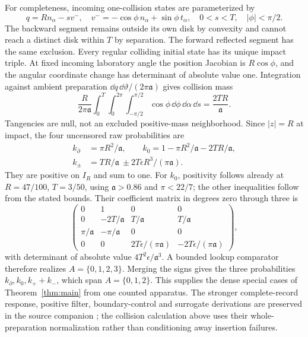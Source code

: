 For completeness, incoming one-collision states are parameterized by
\[
 q=Rn_\alpha-sv^-,\quad
 v^-=-\cos\phi\,n_\alpha+\sin\phi\,t_\alpha,
 \quad 0<s<T,\quad |\phi|<\pi/2.
\]
The backward segment remains outside its own disk by convexity and cannot
reach a distinct disk within $T$ by separation. The forward reflected
segment has the same exclusion. Every regular colliding initial state
has its unique impact triple. At fixed incoming laboratory angle the
position Jacobian is $R\cos\phi$, and the angular coordinate change
has determinant of absolute value one. Integration against ambient
preparation $\dd q\,\dd\vartheta/(2\pi\mathfrak a)$ gives collision
mass
\[
 \frac{R}{2\pi\mathfrak a}
      \int_0^T\int_0^{2\pi}\int_{-\pi/2}^{\pi/2}
                       \cos\phi\,\dd\phi\,\dd\alpha\,\dd s
 =\frac{2TR}{\mathfrak a}.
\]
Tangencies are null, not an excluded positive-mass neighborhood.
Since $|z|=R$ at impact, the four uncensored raw probabilities are
\begin{equation}\label{eq:mechanical-cells}
 \begin{split}
 k_\partial&=\pi R^2/\mathfrak a,\qquad
 k_0=1-\pi R^2/\mathfrak a-2TR/\mathfrak a,\\
 k_\pm&=TR/\mathfrak a\ \pm 2T\epsilon R^3/(\pi\mathfrak a).
 \end{split}
\end{equation}
They are positive on $I_R$ and sum to one. For $k_0$, positivity follows
already at $R=47/100$, $T=3/50$, using $\mathfrak a>0.86$ and
$\pi<22/7$; the other inequalities follow from the stated bounds.
Their coefficient matrix in degrees zero through three is
\[
 \begin{pmatrix}
 0&1&0&0\\
 0&-2T/\mathfrak a&T/\mathfrak a&T/\mathfrak a\\
 \pi/\mathfrak a&-\pi/\mathfrak a&0&0\\
 0&0&2T\epsilon/(\pi\mathfrak a)&-2T\epsilon/(\pi\mathfrak a)
 \end{pmatrix},
\]
with determinant of absolute value $4T^2\epsilon/\mathfrak a^3$.
A bounded lookup comparator therefore realizes $A=\{0,1,2,3\}$.
Merging the signs gives the three probabilities
$k_\partial,k_0,k_++k_-$, which span $A=\{0,1,2\}$.
This supplies the dense special cases of Theorem~\ref{thm:main} from
one counted apparatus. The stronger complete-record response, positive
filter, boundary-control and surrogate derivations are preserved in the
source companion \cite{A1v5}; the collision calculation above uses their
whole-preparation normalization rather than conditioning away insertion
failures.

